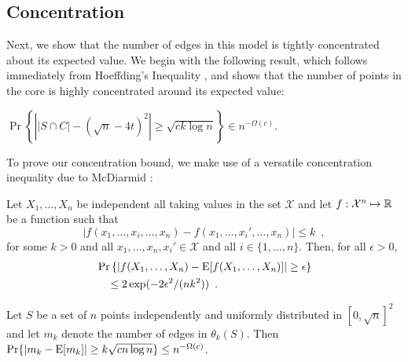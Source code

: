 \documentclass[twoside,leqno,twocolumn]{article}
\begin{document}
\subsection{Concentration}

Next, we show that the number of edges in this model is tightly
concentrated about its expected value.  We begin with the following
result, which follows immediately from Hoeffding's Inequality
\cite{boucheron.lugosi.ea:concentration}, and shows that the number of
points in the core is highly concentrated around its expected value:
\begin{lem}
  $\Pr\left\{\left||S\cap C|-(\sqrt{n}-4t)^2\right| \ge \sqrt{ck\log n}\right\}
  \in n^{-\Omega(c)}$.
\end{lem}

To prove our concentration bound, we make use of a versatile concentration
inequality due to McDiarmid \cite[Lemma~1.2]{mcdiarmid:on}:

\begin{lem}
Let $X_1,\ldots,X_n$ be independent all taking values in the set
$\mathcal{X}$ and let $f:\mathcal{X}^n\mapsto\mathbb{R}$ be a function such that
\[
    |f(x_1,\ldots,x_i,\ldots,x_n) - f(x_1,\ldots,x_i',\ldots,x_n)|
    \le k \enspace ,
\]
for some $k>0$ and all $x_1,\ldots,x_n,x_i'\in \mathcal{X}$
and all $i\in\{1,\ldots,n\}$.
Then, for all $\epsilon > 0$,
\begin{align*}
    & \Pr\left\{\left|f(X_1,\ldots,X_n) - \mathrm{E}[f(X_1,\ldots,X_n)]\right| \ge \epsilon\right\} \\
    &\quad \le 2\exp(-2\epsilon^2/(nk^2)) \enspace .
\end{align*}
\end{lem}

\begin{lem}
 Let $S$ be a set of $n$ points independently and uniformly distributed
 in $[0,\sqrt{n}]^2$ and let $m_k$ denote the number of edges in $\theta_k(S)$.
 Then $\Pr\{|m_k-\mathrm{E}[m_k]| \ge k\sqrt{cn\log n}\} \le n^{-\Omega(c)}$.
\end{lem}
\end{document}
